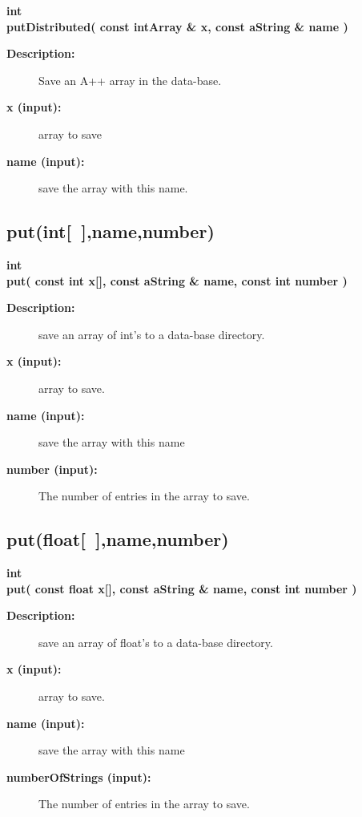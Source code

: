  
\begin{flushleft} \textbf{%
int  \\ 
\settowidth{\GenericDataBaseIncludeArgIndent}{putDistributed(}%
putDistributed( const intArray \& x, const aString \& name )
}\end{flushleft}
    
\begin{description}
\item[{\bf Description:}]  Save an A++ array in the data-base.
\item[{\bf x (input):}]  array to save
\item[{\bf name (input):}]  save the array with this name.
    
\end{description}
\subsection{put(int[~],name,number) }
 
\begin{flushleft} \textbf{%
int  \\ 
\settowidth{\GenericDataBaseIncludeArgIndent}{put(}%
put( const int x[], const aString \& name, const int number ) 
}\end{flushleft}
    
\begin{description}
\item[{\bf Description:}]  save an array of int's to a data-base directory.
\item[{\bf x (input):}]  array to save.
\item[{\bf name (input):}]  save the array with this name
\item[{\bf number (input):}]  The number of entries in the array to save.

\end{description}
\subsection{put(float[~],name,number) }
 
\begin{flushleft} \textbf{%
int  \\ 
\settowidth{\GenericDataBaseIncludeArgIndent}{put(}%
put( const float x[], const aString \& name, const int number ) 
}\end{flushleft}
    
\begin{description}
\item[{\bf Description:}]  save an array of float's to a data-base directory.
\item[{\bf x (input):}]  array to save.
\item[{\bf name (input):}]  save the array with this name
\item[{\bf numberOfStrings (input):}]  The number of entries in the array to save.

\end{description}
